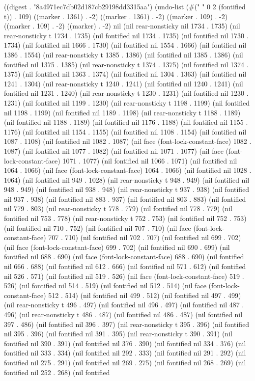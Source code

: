 
((digest . "8a4971ec7db02d187cb29198dd3315aa") (undo-list (#(" 
" 0 2 (fontified t)) . 109) ((marker . 1361) . -2) ((marker . 1361) . -2) ((marker . 109) . -2) ((marker . 109) . -2) ((marker) . -2) nil (nil rear-nonsticky nil 1734 . 1735) (nil rear-nonsticky t 1734 . 1735) (nil fontified nil 1734 . 1735) (nil fontified nil 1730 . 1734) (nil fontified nil 1666 . 1730) (nil fontified nil 1554 . 1666) (nil fontified nil 1386 . 1554) (nil rear-nonsticky t 1385 . 1386) (nil fontified nil 1385 . 1386) (nil fontified nil 1375 . 1385) (nil rear-nonsticky t 1374 . 1375) (nil fontified nil 1374 . 1375) (nil fontified nil 1363 . 1374) (nil fontified nil 1304 . 1363) (nil fontified nil 1241 . 1304) (nil rear-nonsticky t 1240 . 1241) (nil fontified nil 1240 . 1241) (nil fontified nil 1231 . 1240) (nil rear-nonsticky t 1230 . 1231) (nil fontified nil 1230 . 1231) (nil fontified nil 1199 . 1230) (nil rear-nonsticky t 1198 . 1199) (nil fontified nil 1198 . 1199) (nil fontified nil 1189 . 1198) (nil rear-nonsticky t 1188 . 1189) (nil fontified nil 1188 . 1189) (nil fontified nil 1176 . 1188) (nil fontified nil 1155 . 1176) (nil fontified nil 1154 . 1155) (nil fontified nil 1108 . 1154) (nil fontified nil 1087 . 1108) (nil fontified nil 1082 . 1087) (nil face (font-lock-constant-face) 1082 . 1087) (nil fontified nil 1077 . 1082) (nil fontified nil 1071 . 1077) (nil face (font-lock-constant-face) 1071 . 1077) (nil fontified nil 1066 . 1071) (nil fontified nil 1064 . 1066) (nil face (font-lock-constant-face) 1064 . 1066) (nil fontified nil 1028 . 1064) (nil fontified nil 949 . 1028) (nil rear-nonsticky t 948 . 949) (nil fontified nil 948 . 949) (nil fontified nil 938 . 948) (nil rear-nonsticky t 937 . 938) (nil fontified nil 937 . 938) (nil fontified nil 883 . 937) (nil fontified nil 803 . 883) (nil fontified nil 779 . 803) (nil rear-nonsticky t 778 . 779) (nil fontified nil 778 . 779) (nil fontified nil 753 . 778) (nil rear-nonsticky t 752 . 753) (nil fontified nil 752 . 753) (nil fontified nil 710 . 752) (nil fontified nil 707 . 710) (nil face (font-lock-constant-face) 707 . 710) (nil fontified nil 702 . 707) (nil fontified nil 699 . 702) (nil face (font-lock-constant-face) 699 . 702) (nil fontified nil 690 . 699) (nil fontified nil 688 . 690) (nil face (font-lock-constant-face) 688 . 690) (nil fontified nil 666 . 688) (nil fontified nil 612 . 666) (nil fontified nil 571 . 612) (nil fontified nil 526 . 571) (nil fontified nil 519 . 526) (nil face (font-lock-constant-face) 519 . 526) (nil fontified nil 514 . 519) (nil fontified nil 512 . 514) (nil face (font-lock-constant-face) 512 . 514) (nil fontified nil 499 . 512) (nil fontified nil 497 . 499) (nil rear-nonsticky t 496 . 497) (nil fontified nil 496 . 497) (nil fontified nil 487 . 496) (nil rear-nonsticky t 486 . 487) (nil fontified nil 486 . 487) (nil fontified nil 397 . 486) (nil fontified nil 396 . 397) (nil rear-nonsticky t 395 . 396) (nil fontified nil 395 . 396) (nil fontified nil 391 . 395) (nil rear-nonsticky t 390 . 391) (nil fontified nil 390 . 391) (nil fontified nil 376 . 390) (nil fontified nil 334 . 376) (nil fontified nil 333 . 334) (nil fontified nil 292 . 333) (nil fontified nil 291 . 292) (nil fontified nil 275 . 291) (nil fontified nil 269 . 275) (nil fontified nil 268 . 269) (nil fontified nil 252 . 268) (nil fontified 